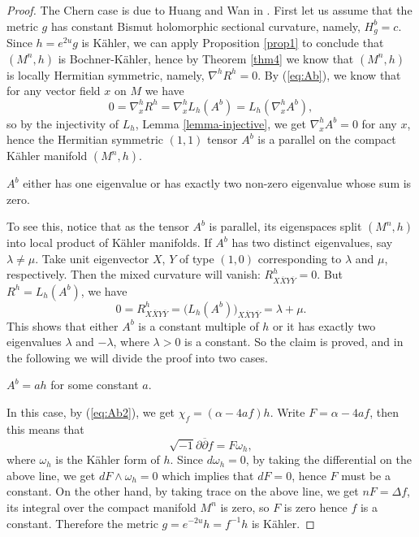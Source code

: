 \documentclass{amsart}
\numberwithin{equation}{section}
\begin{document}
\begin{proof}
The Chern case is due to Huang and Wan in \cite[Proposition 4.1]{HW}. First let us assume that the metric $g$ has constant Bismut holomorphic sectional curvature, namely, $H^b_g=c$. Since $h=e^{2u}g$ is K\"ahler, we can apply Proposition \ref{prop1} to conclude that $(M^n,h)$ is Bochner-K\"ahler, hence by Theorem \ref{thm4} we know that $(M^n,h)$ is locally Hermitian symmetric, namely, $\nabla^hR^h=0$.  By (\ref{eq:Ab}), we know that for any vector field $x$ on $M$ we have
$$ 0 = \nabla^h_xR^h = \nabla^h_xL_h(A^b) = L_h(\nabla^h_xA^b), $$
so by the injectivity of $L_h$, Lemma \ref{lemma-injective}, we get $\nabla^h_xA^b=0$ for any $x$, hence the Hermitian symmetric $(1,1)$ tensor $A^b$ is a parallel on the compact K\"ahler manifold $(M^n,h)$.

\vspace{0.1cm}

 $A^b$ either has one eigenvalue or has exactly two non-zero eigenvalue whose sum is zero.

\vspace{0.1cm}

To see this, notice that as the tensor $A^b$ is parallel, its eigenspaces split $(M^n,h)$ into local product of K\"ahler manifolds. If $A^b$ has two distinct eigenvalues, say $\lambda \neq \mu$. Take unit eigenvector $X$, $Y$ of type $(1,0)$ corresponding to $\lambda$ and $\mu$, respectively. Then the mixed curvature will vanish: $R^h_{X\overline{X}Y\overline{Y}}=0$. But $R^h=L_h(A^b)$, we have
$$ 0 = R^h_{X\overline{X}Y\overline{Y}} = \big(L_h(A^b)\big)_{X\overline{X}Y\overline{Y}} = \lambda + \mu.$$
This shows that either $A^b$ is a constant multiple of $h$ or it has exactly two eigenvalues $\lambda$ and $-\lambda$, where $\lambda >0$ is a constant. So the claim is proved, and in the following we will divide the proof into two cases.

\vspace{0.1cm}

 $A^b=ah$ for some constant $a$.

In this case, by (\ref{eq:Ab2}), we get $\chi_f = (\alpha -4af)h$. Write $F=\alpha-4af$, then this means that
$$ \sqrt{-1}\partial \overline{\partial } f = F \omega_h, $$
where $\omega_h$ is the K\"ahler form of $h$. Since $d\omega_h=0$, by taking the differential on the above line, we get $dF \wedge \omega_h=0$ which implies that $dF=0$, hence $F$ must be a constant. On the other hand, by taking trace on the above line, we get $nF=\Delta f$, its integral over the compact manifold $M^n$ is zero, so $F$ is zero hence $f$ is a constant. Therefore the metric $g=e^{-2u}h=f^{-1}h$ is K\"ahler.


\end{proof}
\end{document}
